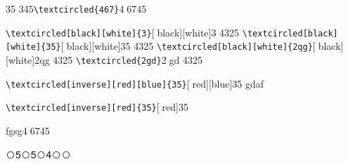 \documentclass{ctexart}
\begin{document}
35 345\verb|\textcircled{467}|\textcircled{467}45

 \verb|\textcircled[black][white]{3}|\textcircled[black][white]{3} 4325
   \verb|\textcircled[black][white]{35}|\textcircled[black][white]{35} 4325
  \verb|\textcircled[black][white]{2qg}|\textcircled[black][white]{2qg} 4325
    \verb|\textcircled{2gd}|\textcircled{2gd} 4325
 
  \verb|\textcircled[inverse][red][blue]{35}|\textcircled[red][blue]{35} gdaf
  
   \verb|\textcircled[inverse][red]{35}|\textcircled[red]{35}

fgsg\textcircled{467}45
   
\newcommand{\wcnt}{\textcircled{\themycnt}}

\wcnt5\wcnt5\wcnt4\wcnt\wcnt
\end{document}
